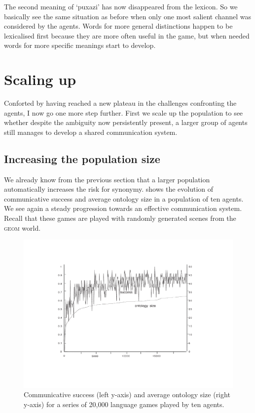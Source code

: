 The second meaning of `puxazi' has now disappeared
from the lexicon. So we basically see the same situation 
as before when only one most salient channel was
considered by the agents. Words for more general distinctions
happen to be lexicalised first because they are more 
often useful in the game, but when needed words for more specific
meanings start to develop. 

\section{Scaling up}

Conforted by having reached a new plateau in 
the challenges confronting the agents, I now go 
one more step further. First we scale up the 
population to see whether despite the ambiguity
now persistently present, a larger group of 
agents still manages to develop a shared
communication system. 

\subsection{Increasing the population size}

We already know from the previous section that 
a larger population automatically increases
the risk for synonymy.  shows the 
evolution of communicative success and average
ontology size in a population
of ten agents. We see again a steady progression
towards an effective communication system. Recall that 
these games are played with randomly generated scenes
from the \textsc{geom} world. 


\begin{figure}[htbp]
  \centerline{\includegraphics[width=\textwidth]{chap6/figs/agnt10.pdf}}
\caption{\label{agnt10}Communicative 
success (left y-axis) and average ontology size 
(right y-axis) for a series of 20,000 
language games played by ten agents.} 
\end{figure}

